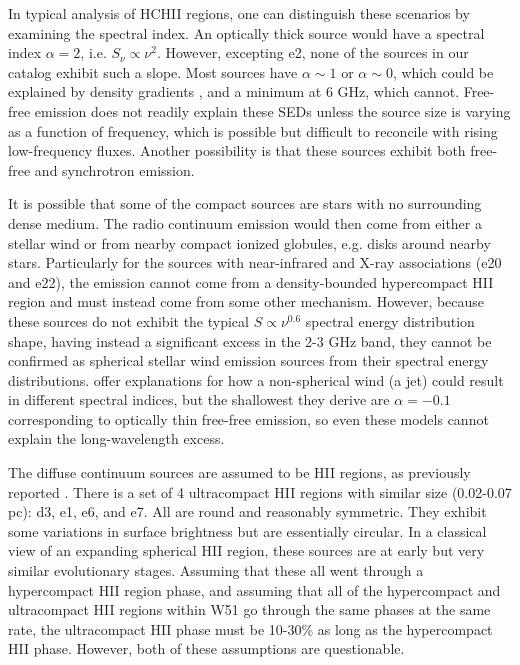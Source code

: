 In typical analysis of HCHII regions, one can distinguish these scenarios by
examining the spectral index.  An optically thick source would have a spectral
index $\alpha=2$, i.e. $S_\nu \propto \nu^2$.  However, excepting e2, none of
the sources in our catalog exhibit such a slope.  Most sources have
$\alpha\sim1$ or $\alpha\sim0$, which could be explained by density gradients
\citep{Keto2008a,Galvan-Madrid2009a}, and a minimum at 6 GHz, which cannot.
Free-free emission does not readily explain these SEDs unless the source size
is varying as a function of frequency, which is possible but difficult to
reconcile with rising low-frequency fluxes.  Another possibility is that these
sources exhibit both free-free and synchrotron emission.

It is possible that some of the compact sources are stars with no surrounding
dense medium.  The radio continuum emission would then come from either a
stellar wind \citep{Gaume1993a} or from nearby compact ionized globules, e.g.
disks around nearby stars.  Particularly for the sources with near-infrared and
X-ray associations (e20 and e22), the emission cannot come from a
density-bounded hypercompact HII region and must instead come from some other
mechanism.  However, because these sources do not exhibit the typical
$S\propto\nu^{0.6}$ spectral energy distribution shape, having instead a
significant excess in the 2-3 GHz band, they cannot be confirmed as
spherical stellar wind emission sources from their spectral energy distributions.
\citet{Reynolds1986a} offer explanations for how a non-spherical wind (a jet)
could result in different spectral indices, but the shallowest they derive
are $\alpha=-0.1$ corresponding to optically thin free-free emission, so even
these models cannot explain the long-wavelength excess.

The diffuse continuum sources are assumed to be HII regions, as previously
reported \citep{Gaume1993a,Mehringer1994a}.  There is a set of 4 ultracompact
HII regions with similar size (0.02-0.07 pc): d3, e1, e6, and e7.  All are
round and reasonably symmetric.  They exhibit some variations in surface
brightness but are essentially circular.  In a classical view of an expanding
spherical HII region, these sources are at early but very similar evolutionary
stages.  Assuming that these all went through a hypercompact HII region phase,
and assuming that all of the hypercompact and ultracompact HII regions within
W51 go through the same phases at the same rate, the ultracompact HII phase
must be 10-30\% as long as the hypercompact HII phase.  However, both of these
assumptions are questionable.


